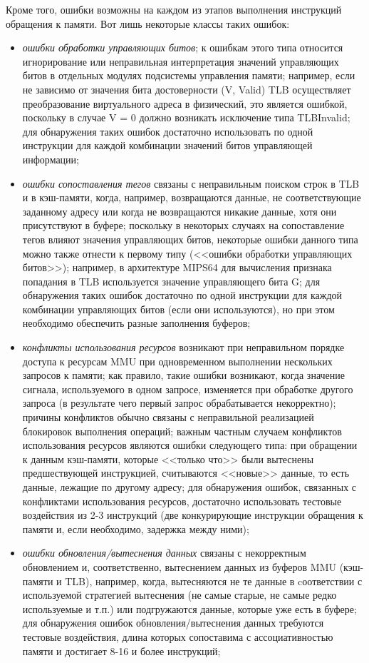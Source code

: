 Кроме того, ошибки возможны на каждом из этапов выполнения инструкций обращения к памяти. Вот лишь некоторые классы таких ошибок:
\begin{itemize}
  \item \emph{ошибки обработки управляющих битов}; к ошибкам этого типа относится игнорирование или неправильная интерпретация значений управляющих битов в отдельных модулях подсистемы управления памяти; например, если не зависимо от значения бита достоверности (V, Valid) TLB осуществляет преобразование виртуального адреса в физический, это является ошибкой, поскольку в случае V = 0 должно возникать исключение типа TLBInvalid; для обнаружения таких ошибок достаточно использовать по одной инструкции для каждой комбинации значений битов управляющей информации;
  \item \emph{ошибки сопоставления тегов} связаны с неправильным поиском строк в TLB и в кэш-памяти, когда, например, возвращаются данные, не соответствующие заданному адресу или когда не возвращаются никакие данные, хотя они присутствуют в буфере; поскольку в некоторых случаях на сопоставление тегов влияют значения управляющих битов, некоторые ошибки данного типа можно также отнести к первому типу (<<ошибки обработки управляющих битов>>); например, в архитектуре MIPS64 для вычисления признака попадания в TLB используется значение управляющего бита G; для обнаружения таких ошибок достаточно по одной инструкции для каждой комбинации управляющих битов (если они используются), но при этом необходимо обеспечить разные заполнения буферов;
  \item \emph{конфликты использования ресурсов} возникают при неправильном порядке доступа к ресурсам MMU при одновременном выполнении нескольких запросов к памяти; как правило, такие ошибки возникают, когда значение сигнала, используемого в одном запросе, изменяется при обработке другого запроса (в результате чего первый запрос обрабатывается некорректно); причины конфликтов обычно связаны с неправильной реализацией блокировок выполнения операций; важным частным случаем конфликтов использования ресурсов являются ошибки следующего типа: при обращении к данным кэш-памяти, которые <<только что>> были вытеснены предшествующей инструкцией, считываются <<новые>> данные, то есть данные, лежащие по другому адресу; для обнаружения ошибок, связанных с конфликтами использования ресурсов, достаточно использовать тестовые воздействия из 2-3 инструкций (две конкурирующие инструкции обращения к памяти и, если необходимо, задержка между ними);
  \item \emph{ошибки обновления/вытеснения данных} связаны с некорректным обновлением и, соответственно, вытеснением данных из буферов MMU (кэш-памяти и TLB), например, когда, вытесняются не те данные в cоответствии с используемой стратегией вытеснения (не самые старые, не самые редко используемые и т.п.) или подгружаются данные, которые уже есть в буфере; для обнаружения ошибок обновления/вытеснения данных требуются тестовые воздействия, длина которых сопоставима с ассоциативностью памяти и достигает 8-16 и более инструкций;

\end{itemize}

